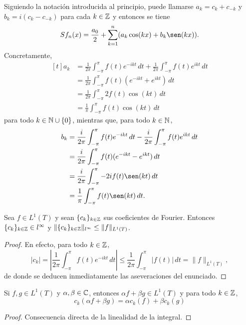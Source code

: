 \documentclass[a4paper, 11pt, oneside]{report}
\begin{document}
Siguiendo la notación introducida al principio, puede llamarse $a_k = c_k+c_{-k}$ y $b_k = i(c_k-c_{-k})$ para cada $k \in \mathbb Z$ y entonces se tiene
\[Sf_n(x) = \frac{a_0}{2}+\sum_{k=1}^n (a_k\cos(kx)+b_k\sen(kx)).\]
Concretamente,
\[
\begin{aligned}[t]
a_k &= \frac{1}{2\pi}\int_{-\pi}^\pi f(t)e^{-ikt}\, dt + \frac{1}{2\pi} \int_{-\pi}^\pi f(t)e^{ikt} \, dt \\
&= \frac{1}{2\pi}\int_{-\pi}^\pi f(t)(e^{-ikt}+e^{ikt}) \, dt \\
&= \frac{1}{2\pi}\int_{-\pi}^\pi 2f(t)\cos(kt) \, dt \\
&= \frac{1}{\pi}\int_{-\pi}^\pi f(t)\cos(kt) \, dt
\end{aligned}
\]
para todo $k \in \mathbb N \cup \{0\}$, mientras que, para todo $k \in \mathbb N$,
\[\begin{aligned}[t]
  b_k &= \frac{i}{2\pi}\int_{-\pi}^\pi f(t)e^{-ikt}\, dt - \frac{i}{2\pi} \int_{-\pi}^\pi f(t)e^{ikt} \, dt \\
  &= \frac{i}{2\pi}\int_{-\pi}^\pi f(t)(e^{-ikt}-e^{ikt}) \, dt \\
  &= \frac{i}{2\pi}\int_{-\pi}^\pi -2if(t)\sen(kt) \, dt \\
  &= \frac{1}{\pi}\int_{-\pi}^\pi f(t)\sen(kt) \, dt.
\end{aligned}\]

\begin{proposition}\label{pro:4.1.3}
  Sea $f \in L^1(T)$ y sean $\{c_k\}_{k \in \mathbb Z}$ sus coeficientes de Fourier. Entonces $\{c_k\}_{k \in \mathbb Z} \in l^\infty$ y $\|\{c_k\}_{k\in\mathbb Z}\|_{l^\infty} \leq \|f\|_{L^1(T)}$.
\end{proposition}

\begin{proof}
  En efecto, para todo $k \in \mathbb Z$,
  \[|c_k| = \left|\frac{1}{2\pi}\int_{-\pi}^\pi f(t)e^{-ikt} \, dt\right| \leq \frac{1}{2\pi}\int_{-\pi}^\pi|f(t)| \, dt = \|f\|_{L^1(T)},\]
  de donde se deducen inmediatamente las aseveraciones del enunciado.
\end{proof}

\begin{proposition}\label{pro:4.1.4}
  Si $f,g \in L^1(T)$ y $\alpha,\beta \in \mathbb C$, entonces $\alpha f + \beta g \in L^1(T)$ y para todo $k \in \mathbb Z$, \[c_k(\alpha f+\beta g) = \alpha c_k(f)+\beta c_k(g)\]
\end{proposition}

\begin{proof}
  Consecuencia directa de la linealidad de la integral.
\end{proof}
\end{document}
